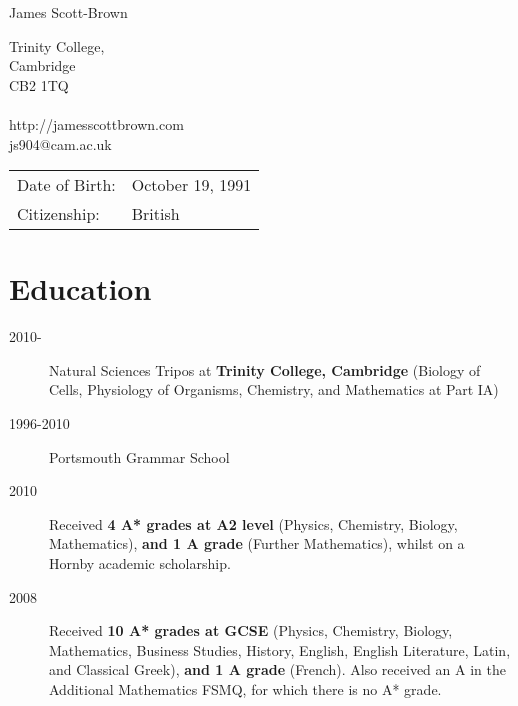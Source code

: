 \documentclass[letterpaper]{article}
\def\name{James Scott-Brown}
\begin{document}
{\huge \name}


\vspace{0.25in}
\begin{minipage}[t]{0.5\textwidth}
Trinity College,\\
Cambridge\\
CB2 1TQ\\ \\
http://jamesscottbrown.com\\
js904@cam.ac.uk \\
\end{minipage}
\begin{minipage}[t]{0.5\textwidth}
\begin{tabular}{ll}  	
Date of Birth: &October 19, 1991 \\
Citizenship: &British
\end{tabular}
\end{minipage}



\section*{Education}
\begin{description}
 \item[2010-] Natural Sciences Tripos at {\bf Trinity College, Cambridge} (Biology of Cells, Physiology of Organisms, Chemistry, and Mathematics at Part IA)
 \item[1996-2010] Portsmouth Grammar School 
 \item[2010] Received {\bf 4 A* grades at A2 level} (Physics, Chemistry, Biology, Mathematics), {\bf and 1 A grade} (Further Mathematics), whilst on a Hornby academic scholarship.
 \item[2008] Received {\bf 10 A* grades at GCSE} (Physics, Chemistry, Biology, Mathematics, Business Studies, History, English, English Literature, Latin, and Classical Greek), {\bf and 1 A grade} (French). Also received an A in the Additional Mathematics FSMQ, for which there is no A* grade.
\end{description}
\end{document}

